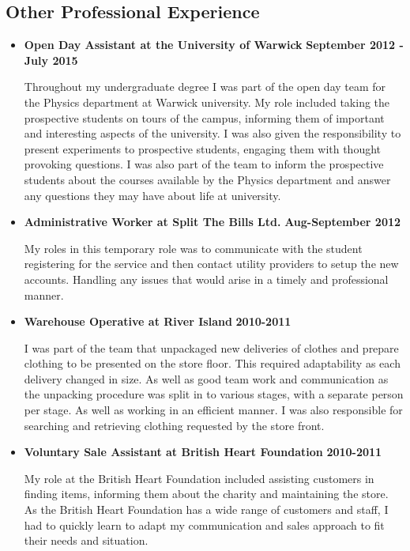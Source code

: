 \documentclass[a4paper,12pt]{article}
\begin{document}
\hypertarget{other-professional-experience}{%
\subsection{Other Professional
Experience}\label{other-professional-experience}}

\begin{itemize}
\item
  \textbf{Open Day Assistant at the University of Warwick}
  {\textbf{September 2012 - July 2015}}

  Throughout my undergraduate degree I was part of the open day team for
  the Physics department at Warwick university. My role included taking
  the prospective students on tours of the campus, informing them of
  important and interesting aspects of the university. I was also given
  the responsibility to present experiments to prospective students,
  engaging them with thought provoking questions. I was also part of the
  team to inform the prospective students about the courses available by
  the Physics department and answer any questions they may have about
  life at university.
\item
  \textbf{Administrative Worker at Split The Bills Ltd.}
  {\textbf{Aug-September 2012}}

  My roles in this temporary role was to communicate with the student
  registering for the service and then contact utility providers to
  setup the new accounts. Handling any issues that would arise in a
  timely and professional manner.
\item
  \textbf{Warehouse Operative at River Island} {\textbf{2010-2011}}

  I was part of the team that unpackaged new deliveries of clothes and
  prepare clothing to be presented on the store floor. This required
  adaptability as each delivery changed in size. As well as good team
  work and communication as the unpacking procedure was split in to
  various stages, with a separate person per stage. As well as working
  in an efficient manner. I was also responsible for searching and
  retrieving clothing requested by the store front.
\item
  \textbf{Voluntary Sale Assistant at British Heart Foundation} {
  \textbf{2010-2011}}

  My role at the British Heart Foundation included assisting customers
  in finding items, informing them about the charity and maintaining the
  store. As the British Heart Foundation has a wide range of customers
  and staff, I had to quickly learn to adapt my communication and sales
  approach to fit their needs and situation.
\end{itemize}
\end{document}
